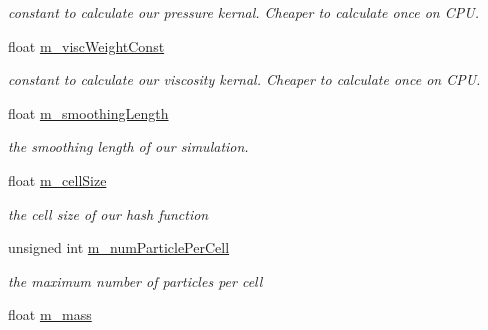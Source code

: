 \begin{DoxyCompactItemize}
\begin{DoxyCompactList}\small\item\em constant to calculate our pressure kernal. Cheaper to calculate once on C\-P\-U. \end{DoxyCompactList}\item 
\hypertarget{class_s_p_h_engine_ab9cc2ab7a2caed7c9a7a29b56285af05}{float \hyperlink{class_s_p_h_engine_ab9cc2ab7a2caed7c9a7a29b56285af05}{m\-\_\-visc\-Weight\-Const}}\label{class_s_p_h_engine_ab9cc2ab7a2caed7c9a7a29b56285af05}

\begin{DoxyCompactList}\small\item\em constant to calculate our viscosity kernal. Cheaper to calculate once on C\-P\-U. \end{DoxyCompactList}\item 
\hypertarget{class_s_p_h_engine_a81f5be51a8eeb86e0e5a42e4a2f40ef7}{float \hyperlink{class_s_p_h_engine_a81f5be51a8eeb86e0e5a42e4a2f40ef7}{m\-\_\-smoothing\-Length}}\label{class_s_p_h_engine_a81f5be51a8eeb86e0e5a42e4a2f40ef7}

\begin{DoxyCompactList}\small\item\em the smoothing length of our simulation. \end{DoxyCompactList}\item 
\hypertarget{class_s_p_h_engine_aec655d6cf4f291f096a3a00118944fae}{float \hyperlink{class_s_p_h_engine_aec655d6cf4f291f096a3a00118944fae}{m\-\_\-cell\-Size}}\label{class_s_p_h_engine_aec655d6cf4f291f096a3a00118944fae}

\begin{DoxyCompactList}\small\item\em the cell size of our hash function \end{DoxyCompactList}\item 
\hypertarget{class_s_p_h_engine_a751b81e76082f5e8aa030a6d7e4f339e}{unsigned int \hyperlink{class_s_p_h_engine_a751b81e76082f5e8aa030a6d7e4f339e}{m\-\_\-num\-Particle\-Per\-Cell}}\label{class_s_p_h_engine_a751b81e76082f5e8aa030a6d7e4f339e}

\begin{DoxyCompactList}\small\item\em the maximum number of particles per cell \end{DoxyCompactList}\item 
\hypertarget{class_s_p_h_engine_a6537ae88a9250d75192b1a9fdab1645d}{float \hyperlink{class_s_p_h_engine_a6537ae88a9250d75192b1a9fdab1645d}{m\-\_\-mass}}\label{class_s_p_h_engine_a6537ae88a9250d75192b1a9fdab1645d}


\end{DoxyCompactItemize}
